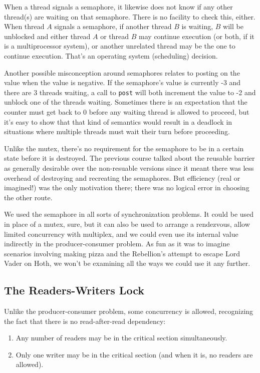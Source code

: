 When a thread signals a semaphore, it likewise does not know if any other thread(s) are waiting on that semaphore. There is no facility to check this, either. When thread $A$ signals a semaphore, if another thread $B$ is waiting, $B$ will be unblocked and either thread $A$ or thread $B$ may continue execution (or both, if it is a multiprocessor system), or another unrelated thread may be the one to continue execution. That's an operating system (scheduling) decision.

Another possible misconception around semaphores relates to posting on the value when the value is negative. If the semaphore's value is currently -3 and there are 3 threads waiting, a call to \texttt{post} will both increment the value to -2 and unblock one of the threads waiting. Sometimes there is an expectation that the counter must get back to 0 before any waiting thread is allowed to proceed, but it's easy to show that that kind of semantics would result in a deadlock in situations where multiple threads must wait their turn before proceeding.

Unlike the mutex, there's no requirement for the semaphore to be in a certain state before it is destroyed. The previous course talked about the reusable barrier as generally desirable over the non-resuable versions since it meant there was less overhead of destroying and recreating the semaphores. But efficiency (real or imagined!) was the only motivation there; there was no logical error in choosing the other route.

We used the semaphore in all sorts of synchronization problems. It could be used in place of a mutex, sure, but it can also be used to arrange a rendezvous, allow limited concurrency with multiplex, and we could even use its internal value indirectly in the producer-consumer problem. As fun as it was to imagine scenarios involving making pizza and the Rebellion's attempt to escape Lord Vader on Hoth, we won't be examining all the ways we could use it any further.

\subsection*{The Readers-Writers Lock}

Unlike the producer-consumer problem, some concurrency is allowed, recognizing the fact that there is no read-after-read dependency:

\begin{enumerate}
	\item Any number of readers may be in the critical section simultaneously.
	\item Only one writer may be in the critical section (and when it is, no readers are allowed).
\end{enumerate}

